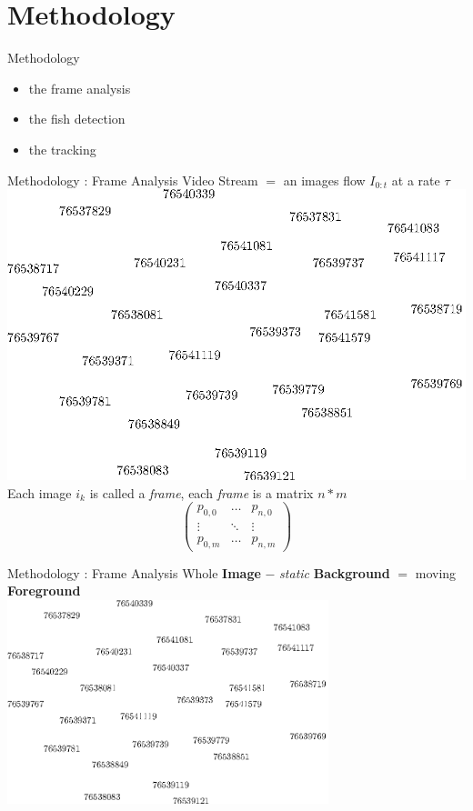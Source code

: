 \documentclass{beamer}
\begin{document}
\section{Methodology}

\begin{frame}[c]{Methodology}
\center
\begin{itemize}
\item the frame analysis
\item the fish detection
\item the tracking
\end{itemize}
\end{frame}

\begin{frame}[c]{Methodology : Frame Analysis}
\center
Video Stream $=$ an images flow $I_{0:t}$ at a rate $\tau$ \\
\includegraphics[height=0.25\textheight]{fig/number/cloud} \\
\pause
\bigskip
Each image $i_k$ is called a \textit{frame}, each \textit{frame} is a matrix $n*m$ 
\[ \left( \begin{array}{ccc}
p_{0,0} & \ldots & p_{n,0} \\
\vdots & \ddots & \vdots \\
p_{0,m} & \ldots & p_{n,m} \end{array} \right)\] 
\end{frame}

\begin{frame}[c]{Methodology : Frame Analysis}
\center
Whole \textbf{Image} $-$ \textit{static} \textbf{Background} $=$ moving \textbf{Foreground}\\
\center \includegraphics[width=0.7\textwidth]{fig/number/cloud} \\
\end{frame}
\end{document}
